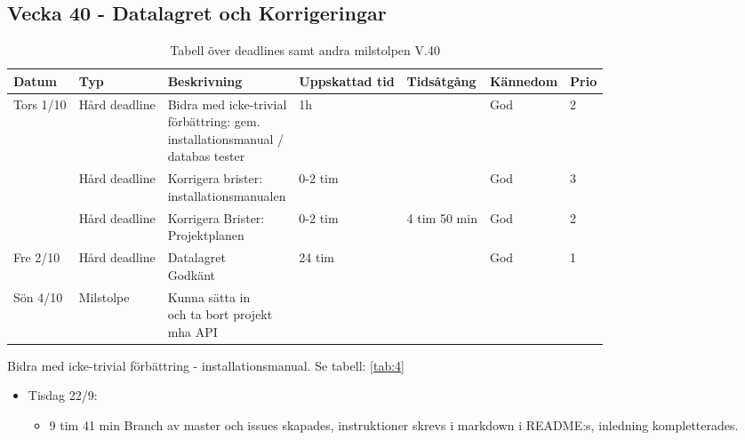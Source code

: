 \documentclass{TDP003mall}
\begin{document}
\subsection*{Vecka 40 - Datalagret och Korrigeringar}
\begin{table}[h!]
     \caption{Tabell över deadlines samt andra milstolpen V.40\label{tab:5}}  
\begin{tabularx}{\linewidth}{|l|l|X|l|l|l|l|}
  \hline
  Datum          & Typ           & Beskrivning                                                                                        & Uppskattad tid & Tidsåtgång            & Kännedom & Prio \\ [0.5ex]
  \hline                                                      
  Tors 1/10      & Hård deadline & \makecell[tl]{Bidra med icke-trivial \\förbättring: gem. \\installationsmanual / \\databas tester} & 1h             &                       & God      & 2\\
  \hline                                                      
                 & Hård deadline & \makecell[tl]{Korrigera brister: \\installationsmanualen}                                          & 0-2 tim        &                       & God      & 3 \\
  \hline                                                      
                 & Hård deadline & \makecell[tl]{Korrigera Brister: \\Projektplanen}                                                  & 0-2 tim        & 4 tim 50 min & God & 2\\
  \hline
        Fre 2/10 & Hård deadline & \makecell[tl]{Datalagret \\Godkänt}                                                                                 & 24 tim         &                 & God      & 1\\
  \hline
  Sön 4/10  & Milstolpe     & \makecell[tl]{Kunna sätta in\\ och ta bort projekt\\ mha API}   &                &                       &          & \\
  \hline
\end{tabularx}   
    \end{table}
    
Bidra med icke-trivial förbättring - installationsmanual. Se tabell: \ref{tab:4}
\begin{itemize}
\item Tisdag 22/9:
  \begin{itemize}
  \item 9 tim 41 min Branch av master och issues skapades, instruktioner skrevs i markdown i README:s, inledning kompletterades.
  \end{itemize}
  \end{itemize}
\end{document}
